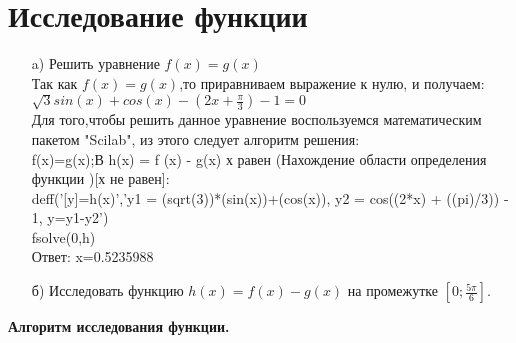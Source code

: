 \documentclass[russian,utf8,nocolumnxxxi,nocolumnxxxii]{eskdtext}
\begin{document}
\newpage
\section{Исследование функции}
\begin{enumerate}
    \item[a)]Решить уравнение $f(x)=g(x)$\\
    Так как $f(x)=g(x)$,то приравниваем выражение к нулю, и получаем:\\ $\sqrt{3}sin(x)+cos(x)-(2x+\frac{\pi}{3})-1=0$\\
    Для того,чтобы решить данное уравнение воспользуемся математическим пакетом "Scilab", из этого следует алгоритм решения:\\
    f(x)=g(x);{В h(x) = f (x) - g(x) х равен (Нахождение области определения функции )[х не равен]}:\\
    deff('[y]=h(x)','y1 = (sqrt(3))*(sin(x))+(cos(x)), y2 = cos((2*x) + ((pi)/3)) - 1, y=y1-y2')\\
    fsolve(0,h)\\
    Ответ: x=0.5235988
\end{enumerate}
\begin{enumerate}
    \item[б)]Исследовать функцию $h(x)=f(x)-g(x)$ на промежутке $[0;\frac{5\pi}{6}]$.
\end{enumerate}
\begin{center}
    \textbf{Алгоритм исследования функции.}
\end{center}
\end{document}

